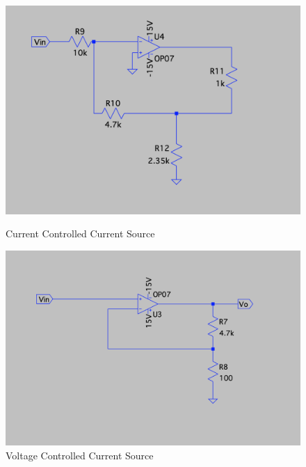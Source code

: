 \documentclass[a4paper,12pt]{report}
\begin{document}
\begin{figure}[h]
        \begin{minipage}{0.45\textwidth}
            \centering
            \includegraphics[width=\linewidth]{../Img/E5CCCS}
            \caption{Current Controlled Current Source}
        \end{minipage}
        \hfill
        \begin{minipage}{0.45\textwidth}
            \centering
            \includegraphics[width=\linewidth]{../Img/E5VCCS}
            \caption{Voltage Controlled Current Source}
        \end{minipage}
    \end{figure}

    \vspace*{\fill} %
    \newpage
\end{document}
